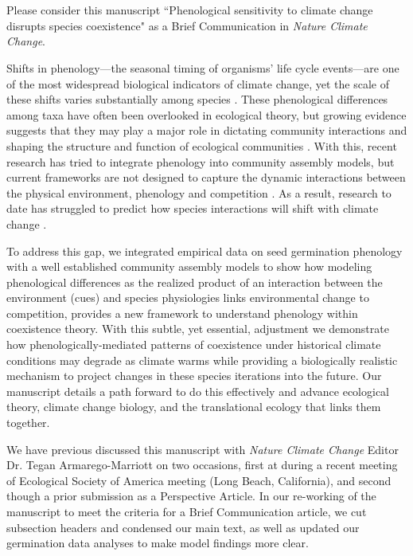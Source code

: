 \documentclass{article}[12pt]
\begin{document}

\def\labelitemi{--}
\parindent=24pt
\\\\

\noindent Please consider this manuscript ``Phenological sensitivity to climate change disrupts species coexistence" as a Brief Communication in \emph{Nature Climate Change}.


Shifts in phenology---the seasonal timing of organisms' life cycle events---are one of the most widespread biological indicators of climate change, yet the scale of these shifts varies substantially among species \citep{Zhang:2022aa,Roslin:2021aa}. These phenological differences among taxa have often been overlooked in ecological theory, but growing evidence suggests that they may play a major role in dictating community interactions and shaping the structure and function of ecological communities \citep{Cleland2024,Alexander:2019aa,volkerisaj}. With this, recent research has tried to integrate phenology into community assembly models, but current frameworks are not designed to capture the dynamic interactions between the physical environment, phenology and competition \citep{Loughnan:2024aa}. As a result, research to date has struggled to predict how species interactions will shift with climate change \citep{Urban:2016aa}.

To address this gap, we integrated empirical data on seed germination phenology with a well established community assembly models to show how modeling phenological differences  as the realized product of an interaction between the environment (cues) and species physiologies links environmental change to competition, provides a new framework to understand phenology within coexistence theory. With this subtle, yet essential, adjustment we demonstrate how phenologically-mediated patterns of coexistence under historical climate conditions may degrade as climate warms while providing a biologically realistic mechanism to project changes in these species iterations into the future. Our manuscript details a path forward to do this effectively and advance ecological theory, climate change biology, and the translational ecology that links them together.

We have previous discussed this manuscript with \emph{Nature Climate Change} Editor Dr. Tegan Armarego-Marriott on two occasions, first at during a recent meeting of Ecological Society of America meeting (Long Beach, California), and second though a prior submission as a Perspective Article. In our re-working of the manuscript to meet the criteria for a Brief Communication article, we cut subsection headers and condensed our main text, as well as updated our germination data analyses to make model findings more clear.
\end{document}
